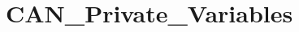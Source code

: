 \hypertarget{group___c_a_n___private___variables}{\section{C\-A\-N\-\_\-\-Private\-\_\-\-Variables}
\label{group___c_a_n___private___variables}
}
